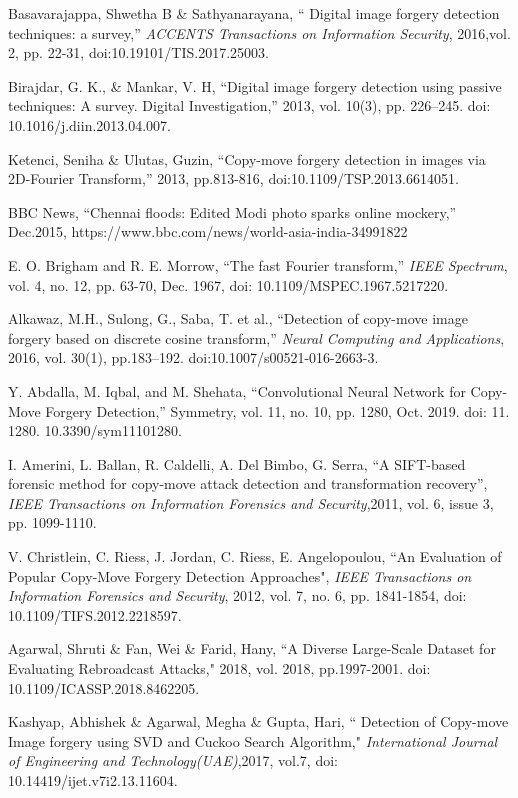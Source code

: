 \documentclass[conference]{IEEEtran}
\begin{document}
\begin{thebibliography}{00}Basavarajappa, Shwetha B \& Sathyanarayana, “ Digital image forgery detection techniques: a survey,” \textit{ACCENTS Transactions on Information Security}, 2016,vol. 2, pp. 22-31,  doi:10.19101/TIS.2017.25003.

Birajdar, G. K., \& Mankar, V. H, “Digital image forgery detection using passive techniques: A survey. Digital Investigation,” 2013, vol. 10(3), pp. 226–245. doi: 10.1016/j.diin.2013.04.007.

Ketenci, Seniha \& Ulutas, Guzin, “Copy-move forgery detection in images via 2D-Fourier Transform,” 2013, pp.813-816, doi:10.1109/TSP.2013.6614051. 

BBC News, “Chennai floods: Edited Modi photo sparks online mockery,” Dec.2015, https://www.bbc.com/news/world-asia-india-34991822 

E. O. Brigham and R. E. Morrow, “The fast Fourier transform,”  \textit{IEEE Spectrum}, vol. 4, no. 12, pp. 63-70, Dec. 1967, doi: 10.1109/MSPEC.1967.5217220.

Alkawaz, M.H., Sulong, G., Saba, T. et al., “Detection of copy-move image forgery based on discrete cosine transform,”\textit{ Neural Computing and Applications}, 2016, vol. 30(1), pp.183–192. doi:10.1007/s00521-016-2663-3.

Y. Abdalla, M. Iqbal, and M. Shehata, “Convolutional Neural Network for Copy-Move Forgery Detection,” Symmetry, vol. 11, no. 10, pp. 1280, Oct. 2019. doi: 11. 1280. 10.3390/sym11101280.

 I. Amerini, L. Ballan, R. Caldelli, A. Del Bimbo, G. Serra, 
“A SIFT-based forensic method for copy-move attack detection and transformation recovery”, \textit{IEEE Transactions on Information Forensics and Security},2011, vol. 6, issue 3, pp. 1099-1110. 

V. Christlein, C. Riess, J. Jordan, C. Riess, E. Angelopoulou, “An Evaluation of Popular Copy-Move Forgery Detection Approaches", 
\textit{IEEE Transactions on Information Forensics and Security}, 2012, vol. 7, no. 6, pp. 1841-1854,  doi: 10.1109/TIFS.2012.2218597.

Agarwal, Shruti \& Fan, Wei \& Farid, Hany, “A Diverse Large-Scale Dataset for Evaluating Rebroadcast Attacks," 2018, vol. 2018, pp.1997-2001. doi: 10.1109/ICASSP.2018.8462205.

Kashyap, Abhishek \& Agarwal, Megha \& Gupta, Hari, “ Detection of Copy-move Image forgery using SVD and Cuckoo Search Algorithm," \textit{International Journal of Engineering and Technology(UAE)},2017, vol.7, doi: 10.14419/ijet.v7i2.13.11604. 


\end{thebibliography}
\end{document}
